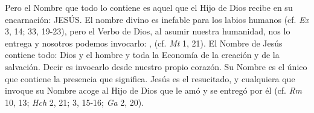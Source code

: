  Pero el Nombre que todo lo contiene es aquel que el Hijo de Dios recibe en su encarnación: JESÚS. El nombre divino es inefable para los labios humanos (cf. \emph{Ex} 3, 14; 33, 19-23), pero el Verbo de Dios, al asumir nuestra humanidad, nos lo entrega y nosotros podemos invocarlo: ,  (cf. \emph{Mt} 1, 21). El Nombre de Jesús contiene todo: Dios y el hombre y toda la Economía de la creación y de la salvación. Decir  es invocarlo desde nuestro propio corazón. Su Nombre es el único que contiene la presencia que significa. Jesús es el resucitado, y cualquiera que invoque su Nombre acoge al Hijo de Dios que le amó y se entregó por él (cf. \emph{Rm} 10, 13; \emph{Hch} 2, 21; 3, 15-16; \emph{Ga} 2, 20).